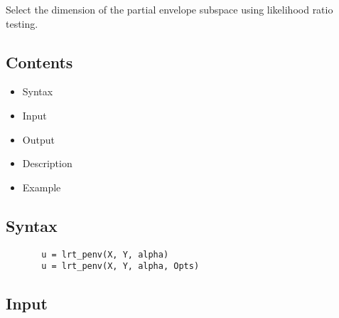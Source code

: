 \documentclass[a4paper,11pt,openany]{memoir}
\begin{document}
\begin{par}
Select the dimension of the partial envelope subspace using likelihood ratio testing.
\end{par} \vspace{1em}

\subsection*{Contents}

\begin{itemize}
\setlength{\itemsep}{-1ex}
   \item Syntax
   \item Input
   \item Output
   \item Description
   \item Example
\end{itemize}


\subsection*{Syntax}


\begin{verbatim}       u = lrt_penv(X, Y, alpha)
       u = lrt_penv(X, Y, alpha, Opts)\end{verbatim}
    

\subsection*{Input}
\end{document}
